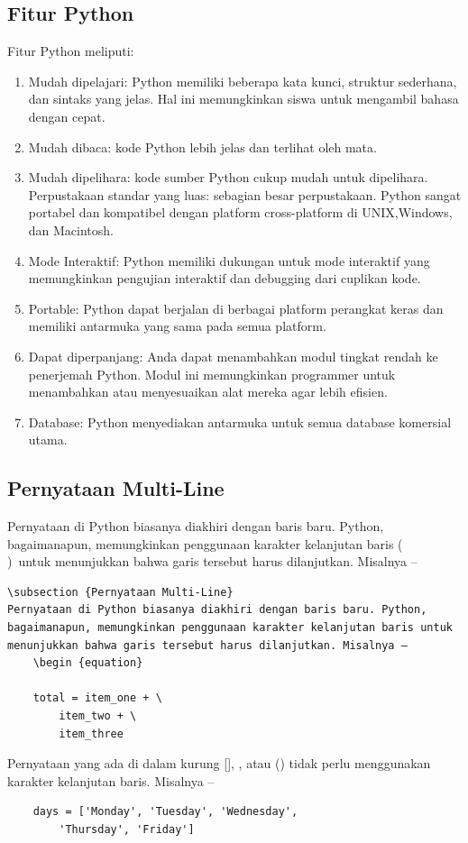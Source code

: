\subsection{Fitur Python}
Fitur Python meliputi:
	\begin{enumerate}
		\item Mudah dipelajari: Python memiliki beberapa kata kunci, struktur sederhana, dan sintaks yang jelas. Hal ini 			memungkinkan siswa untuk mengambil bahasa dengan cepat.
		\item  Mudah dibaca: kode Python lebih jelas dan terlihat oleh mata.
		\item  Mudah dipelihara: kode sumber Python cukup mudah untuk dipelihara. Perpustakaan standar yang luas: sebagian besar 		perpustakaan. Python sangat portabel dan kompatibel dengan
		platform cross-platform di UNIX,Windows, dan Macintosh.
		\item Mode Interaktif: Python memiliki dukungan untuk mode interaktif yang memungkinkan pengujian interaktif dan 			debugging dari 	cuplikan kode.
		\item Portable: Python dapat berjalan di berbagai platform perangkat keras dan memiliki antarmuka yang sama pada semua 			platform.
		\item  Dapat diperpanjang: Anda dapat menambahkan modul tingkat rendah ke penerjemah Python. Modul ini memungkinkan 			programmer untuk menambahkan atau menyesuaikan
		alat mereka agar lebih efisien.
		\item  Database: Python menyediakan antarmuka untuk semua database komersial utama.
	\end{enumerate}



\subsection{Pernyataan Multi-Line}
Pernyataan di Python biasanya diakhiri dengan baris baru. Python, bagaimanapun, memungkinkan penggunaan karakter kelanjutan baris (\\)\ untuk menunjukkan bahwa garis tersebut harus dilanjutkan. Misalnya –
	\begin {verbatim}
\subsection {Pernyataan Multi-Line}
Pernyataan di Python biasanya diakhiri dengan baris baru. Python, bagaimanapun, memungkinkan penggunaan karakter kelanjutan baris untuk menunjukkan bahwa garis tersebut harus dilanjutkan. Misalnya –
	\begin {equation}

	total = item_one + \
		item_two + \
		item_three
	\end {verbatim}

Pernyataan yang ada di dalam kurung [], {}, atau () tidak perlu menggunakan karakter kelanjutan baris. Misalnya –

	\begin{verbatim}
	days = ['Monday', 'Tuesday', 'Wednesday',
		'Thursday', 'Friday']
	\end{verbatim}

